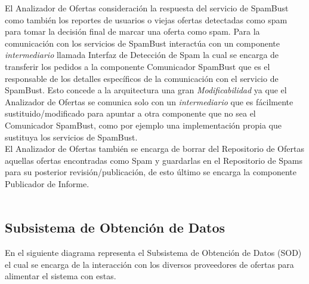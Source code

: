 El \textsf{Analizador de Ofertas} consideración la respuesta del servicio de \textsf{SpamBust} como también los reportes de usuarios o viejas ofertas detectadas como spam para tomar la decisión final de marcar una oferta como spam. Para la comunicación con los servicios de \textsf{SpamBust} interactúa con un componente \emph{intermediario} llamada \textsf{Interfaz de Detección de Spam} la cual se encarga de transferir los pedidos a la componente \textsf{Comunicador SpamBust} que es el responsable de los detalles específicos de la comunicación con el servicio de \textsf{SpamBust}. Esto concede a la arquitectura una gran \emph{Modificabilidad} ya que el \textsf{Analizador de Ofertas} se comunica solo con un \emph{intermediario} que es fácilmente sustituido/modificado para apuntar a otra componente que no sea el \textsf{Comunicador SpamBust}, como por ejemplo una implementación propia que sustituya los servicios de \textsf{SpamBust}.\\

El \textsf{Analizador de Ofertas} también se encarga de borrar del \textsf{Repositorio de Ofertas} aquellas ofertas encontradas como Spam y guardarlas en el \textsf{Repositorio de Spams} para su posterior revisión/publicación, de esto último se encarga la componente \textsf{Publicador de Informe}.\\


\\

\subsection{Subsistema de Obtención de Datos}


En el siguiente diagrama representa el Subsistema de Obtención de Datos (\textsf{SOD}) el cual se encarga de la interacción con los diversos proveedores de ofertas para alimentar el sistema con estas.\\

